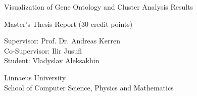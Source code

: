 \begin{titlepage}
\begin{center}

\Huge{Visualization of Gene Ontology and Cluster Analysis Results}

\vfill

\begin{Large}
Master's Thesis Report (30 credit points)

\vfill

Supervisor: Prof. Dr. Andreas Kerren\\
Co-Supervisor: Ilir Jusufi\\
Student: Vladyslav Aleksakhin

\vfill

Linnaeus University\\
School of Computer Science, Physics and Mathematics

\end{Large}


\end{center}
\end{titlepage}

